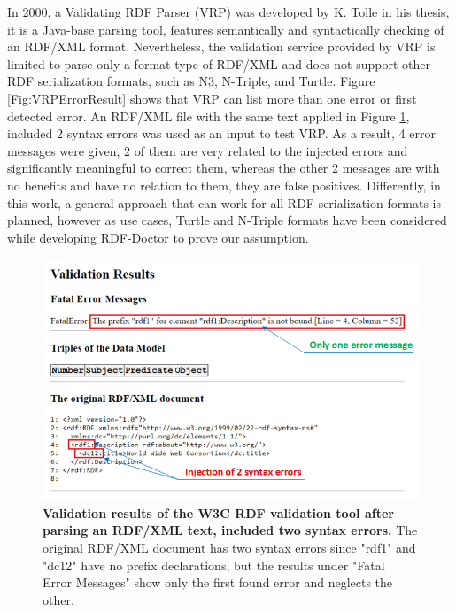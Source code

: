  In 2000, a Validating RDF Parser (VRP) \cite{karsten:Thesis:2000} was developed by K. Tolle in his thesis, it is a Java-base parsing tool, features semantically and syntactically checking of an RDF/XML format. Nevertheless, the validation service provided by VRP is limited to parse only a format type of RDF/XML and does not support other RDF serialization formats, such as N3, N-Triple, and Turtle. Figure \ref{Fig:VRPErrorResult} shows that VRP can list more than one error or first detected error. An RDF/XML file with the same text applied in Figure \ref{Fig:errorW3RDFValidator}, included 2 syntax errors was used as an input to test VRP. As a result, 4 error messages were given, 2 of them are very related to the injected errors and significantly meaningful to correct them, whereas the other 2 messages are with no benefits and have no relation to them, they are false positives. Differently, in this work, a general approach that can work for all RDF serialization formats is planned, however as use cases, Turtle and N-Triple formats have been considered  while developing RDF-Doctor to prove our assumption. 
 
 \begin{figure}[ht]
		\begin{center}
			\setlength\belowcaptionskip{-7mm}
			\includegraphics[scale=0.8,angle=0]{images/errorW3RDFValidator.png}
			\caption{\textbf{Validation results of the W3C RDF validation tool \cite{W3C:Validation:Online} after parsing an RDF/XML text, included two syntax errors.} The original RDF/XML document has two syntax errors since "rdf1" and "dc12" have no prefix declarations, but the results under "Fatal Error Messages"  show only the first found error and neglects the other.}
			\label{Fig:errorW3RDFValidator}
		\end{center}
	\end{figure}
